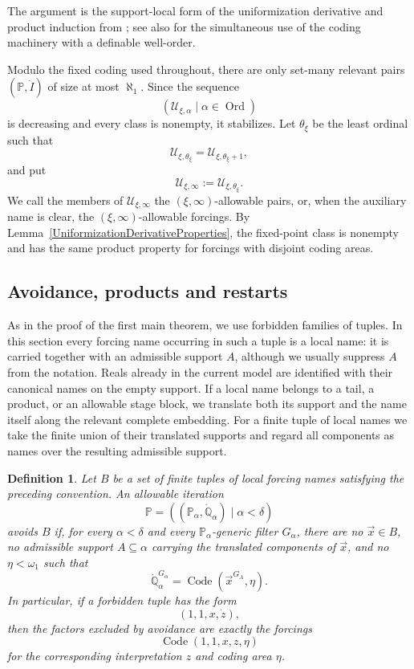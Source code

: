 \documentclass[a4paper,11pt]{article}
\newtheorem{definition}[theorem]{Definition}
\newcommand{\forceP}{\mathbb{P}}
\newcommand{\forceQ}{\mathbb{Q}}
\begin{document}
The argument is the support-local form of the uniformization derivative and product induction from \cite{Uniformization}; see also \cite{Uniformization with wellorder} for the simultaneous use of the coding machinery with a definable well-order.

Modulo the fixed coding used throughout, there are only set-many relevant pairs $(\forceP,\dot I)$ of size at most $\aleph_1$. Since the sequence
\[
(\mathcal U_{\xi,\alpha}\mid\alpha\in\operatorname{Ord})
\]
is decreasing and every class is nonempty, it stabilizes. Let $\theta_\xi$ be the least ordinal such that
\[
\mathcal U_{\xi,\theta_\xi}
=
\mathcal U_{\xi,\theta_\xi+1},
\]
and put
\[
\mathcal U_{\xi,\infty}
:=
\mathcal U_{\xi,\theta_\xi}.
\]
We call the members of $\mathcal U_{\xi,\infty}$ the $(\xi,\infty)$-allowable pairs, or, when the auxiliary name is clear, the $(\xi,\infty)$-allowable forcings. By Lemma~\ref{UniformizationDerivativeProperties}, the fixed-point class is nonempty and has the same product property for forcings with disjoint coding areas.

\subsection{Avoidance, products and restarts}
As in the proof of the first main theorem, we use forbidden families of tuples. In this section every forcing name occurring in such a tuple is a local name: it is carried together with an admissible support $A$, although we usually suppress $A$ from the notation. Reals already in the current model are identified with their canonical names on the empty support. If a local name belongs to a tail, a product, or an allowable stage block, we translate both its support and the name itself along the relevant complete embedding. For a finite tuple of local names we take the finite union of their translated supports and regard all components as names over the resulting admissible support.

\begin{definition}\label{AvoidingBUniformization}
Let $B$ be a set of finite tuples of local forcing names satisfying the preceding convention. An allowable iteration
\[
\forceP=((\forceP_\alpha,\dot{\forceQ}_\alpha)\mid\alpha<\delta)
\]
\emph{avoids $B$} if, for every $\alpha<\delta$ and every $\forceP_\alpha$-generic filter $G_\alpha$, there are no $\vec x\in B$, no admissible support $A\subseteq\alpha$ carrying the translated components of $\vec x$, and no $\eta<\omega_1$ such that
\[
\dot{\forceQ}_\alpha^{G_\alpha}
=
\operatorname{Code}(\vec x^{G_A},\eta).
\]
 In particular, if a forbidden tuple has the form
\[
(1,1,x,\dot z),
\]
then the factors excluded by avoidance are exactly the forcings
\[
\operatorname{Code}(1,1,x,z,\eta)
\]
for the corresponding interpretation $z$ and coding area $\eta$.
\end{definition}
\end{document}
